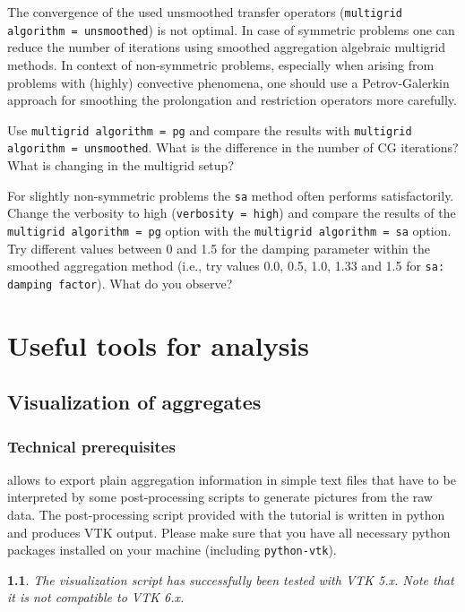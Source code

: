 \documentclass[10pt,fleqn]{book}
\newtheorem*{mycomment}{\ding{42}}
\begin{document}
The convergence of the used unsmoothed transfer operators (\texttt{multigrid algorithm = unsmoothed}) is not optimal. In case of symmetric problems one can reduce the number of iterations using smoothed aggregation algebraic multigrid methods. In context of non-symmetric problems, especially when arising from problems with (highly) convective phenomena, one should use a Petrov-Galerkin approach for smoothing the prolongation and restriction operators more carefully.


\begin{exercise}
Use \texttt{multigrid algorithm = pg} and compare the results with \texttt{multigrid algorithm = unsmoothed}. What is the difference in the number of CG iterations? What is changing in the multigrid setup?
\end{exercise}
\begin{exercise}
For slightly non-symmetric problems the \texttt{sa} method often performs satisfactorily. Change the verbosity to high (\texttt{verbosity = high}) and compare the results of the \texttt{multigrid algorithm = pg} option with the \texttt{multigrid algorithm = sa} option. Try different values between 0 and 1.5 for the damping parameter within the smoothed aggregation method (i.e., try values 0.0, 0.5, 1.0, 1.33 and 1.5 for \texttt{sa: damping factor}). What do you observe?
\end{exercise}

\chapter{Useful tools for analysis}

\section{Visualization of aggregates}

\subsection{Technical prerequisites}
\muelu allows to export plain aggregation information in simple text files that have to be interpreted by some post-processing scripts to generate pictures from the raw data. The post-processing script provided with the \muelu tutorial is written in python and produces VTK output. Please make sure that you have all necessary python packages installed on your machine (including \verb|python-vtk|).

\begin{mycomment}
The visualization script has successfully been tested with VTK 5.x. Note that it is not compatible to VTK 6.x.
\end{mycomment}
\end{document}
